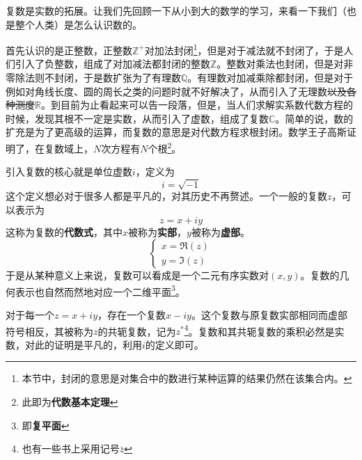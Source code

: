 \documentclass[12pt,a4paper,openany,twoside]{book}
\numberwithin{equation}{section}
\begin{document}
          复数是实数的拓展。让我们先回顾一下从小到大的数学的学习，来看一下我们（也是整个人类）是怎么认识数的。
          
          首先认识的是正整数，正整数$\mathbb{Z}^+$对加法封闭\footnote{本节中，封闭的意思是对集合中的数进行某种运算的结果仍然在该集合内。}，但是对于减法就不封闭了，于是人们引入了负整数，组成了对加减法都封闭的整数$\mathbb{Z}$。整数对乘法也封闭，但是对非零除法则不封闭，于是数扩张为了有理数$\mathbb{Q}$。有理数对加减乘除都封闭，但是对于例如对角线长度、圆的周长之类的问题时就不好解决了，从而引入了无理数\sout{以及各种测度}$\mathbb{R}$。到目前为止看起来可以告一段落，但是，当人们求解实系数代数方程的时候，发现其根不一定是实数，从而引入了虚数，组成了复数$\mathbb{C}$。简单的说，数的扩充是为了更高级的运算，而复数的意思是对代数方程求根封闭。数学王子高斯证明了，在复数域上，$N$次方程有$N$个根\footnote{此即为\textbf{代数基本定理}}。
          
          引入复数的核心就是单位虚数$i$，定义为
          \begin{equation}
            i=\sqrt{-1}
          \end{equation}
          这个定义想必对于很多人都是平凡的，对其历史不再赘述。一个一般的复数$z$，可以表示为
          \begin{equation}
            z=x+iy
          \end{equation}
          这称为复数的\textbf{代数式}，其中$x$被称为\textbf{实部}，$y$被称为\textbf{虚部}。
          \begin{equation*}
            \begin{cases}
              x=\Re(z)\\
              y=\Im(z)
            \end{cases}
          \end{equation*}
          于是从某种意义上来说，复数可以看成是一个二元有序实数对$(x,y)$。复数的几何表示也自然而然地对应一个二维平面\footnote{即\textbf{复平面}}。

          对于每一个$z=x+iy$，存在一个复数$x-iy$。这个复数与原复数实部相同而虚部符号相反，其被称为$z$的共轭复数，记为$z^*$\footnote{也有一些书上采用记号$\bar{z}$}。复数和其共轭复数的乘积必然是实数，对此的证明是平凡的，利用$i$的定义即可。
          
\end{document}
